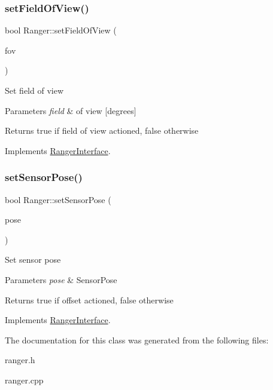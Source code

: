 \mbox{\label{classRanger_afb5d392ca450bcce295e61c121d09157}} 
\subsubsection{\texorpdfstring{set\+Field\+Of\+View()}{setFieldOfView()}}
{\footnotesize\ttfamily bool Ranger\+::set\+Field\+Of\+View (\begin{DoxyParamCaption}\item[{unsigned int}]{fov }\end{DoxyParamCaption})\hspace{0.3cm}{\ttfamily [virtual]}}

Set field of view 
\begin{DoxyParams}{Parameters}
{\em field} & of view \mbox{[}degrees\mbox{]} \\
\hline
\end{DoxyParams}
\begin{DoxyReturn}{Returns}
true if field of view actioned, false otherwise 
\end{DoxyReturn}


Implements \hyperlink{classRangerInterface_a70357ca516198af45e2d503ef6af8f9f}{Ranger\+Interface}.

\mbox{\label{classRanger_aa55ad45d83b8c095a495677ac8873f2b}} 
\subsubsection{\texorpdfstring{set\+Sensor\+Pose()}{setSensorPose()}}
{\footnotesize\ttfamily bool Ranger\+::set\+Sensor\+Pose (\begin{DoxyParamCaption}\item[{\hyperlink{structranger_1_1SensorPose}{ranger\+::\+Sensor\+Pose}}]{pose }\end{DoxyParamCaption})\hspace{0.3cm}{\ttfamily [virtual]}}

Set sensor pose 
\begin{DoxyParams}{Parameters}
{\em pose} & Sensor\+Pose \\
\hline
\end{DoxyParams}
\begin{DoxyReturn}{Returns}
true if offset actioned, false otherwise 
\end{DoxyReturn}


Implements \hyperlink{classRangerInterface_a452301937b5ace7ded943d8aa76a061f}{Ranger\+Interface}.



The documentation for this class was generated from the following files\+:\begin{DoxyCompactItemize}
\item 
ranger.\+h\item 
ranger.\+cpp\end{DoxyCompactItemize}
